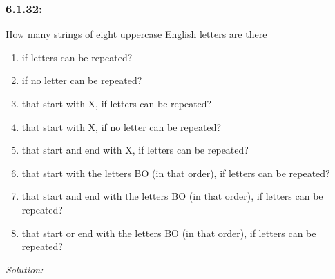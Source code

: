 \documentclass[a4paper]{article}
\begin{document}
	
	\subsubsection*{6.1.32:}How many strings of eight uppercase English letters are there
	\begin{enumerate}[label = \textbf{\alph*)}]
	    \item if letters can be repeated?
	    \item if no letter can be repeated?
        \item that start with X, if letters can be repeated?
        \item that start with X, if no letter can be repeated?
        \item that start and end with X, if letters can be repeated?
        \item that start with the letters BO (in that order), if letters can be repeated?
        \item that start and end with the letters BO (in that order), if letters can be repeated?
        \item that start or end with the letters BO (in that order), if letters can be repeated?
	\end{enumerate}
	\emph{Solution:}
\end{document}
